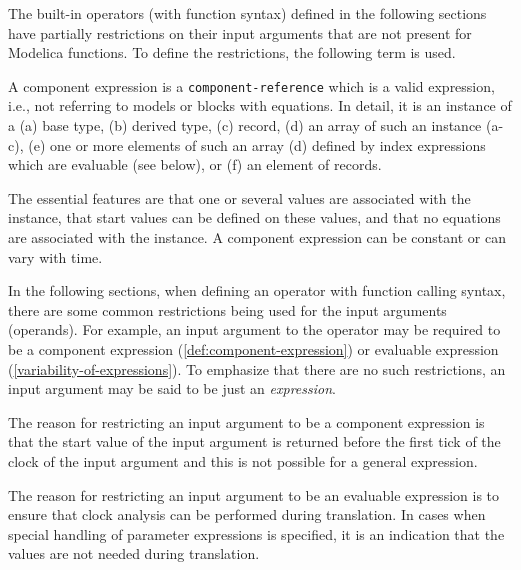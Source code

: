The built-in operators (with function syntax) defined in the following sections have partially restrictions on their input arguments that are not present for Modelica functions.
To define the restrictions, the following term is used.

\begin{definition}\label{def:component-expression}
A component expression is a \lstinline[language=grammar]!component-reference! which is a valid expression, i.e., not referring to models or blocks with equations.
In detail, it is an instance of a (a) base type, (b) derived type, (c) record, (d) an array of such an instance (a-c), (e) one or more elements of such an array (d) defined by index expressions which are evaluable (see below), or (f) an element of records.
\begin{nonnormative}
The essential features are that one or several values are associated with the instance, that start values can be defined on these values, and that no equations are associated with the instance.
A component expression can be constant or can vary with time.
\end{nonnormative}
\end{definition}

In the following sections, when defining an operator with function calling syntax, there are some common restrictions being used for the input arguments (operands).
For example, an input argument to the operator may be required to be a component expression (\cref{def:component-expression}) or evaluable expression (\cref{variability-of-expressions}).
To emphasize that there are no such restrictions, an input argument may be said to be just an \emph{expression}.

\begin{nonnormative}
The reason for restricting an input argument to be a component expression is that the start value of the input argument is returned before the first tick of the clock of the input argument and this
is not possible for a general expression.

The reason for restricting an input argument to be an evaluable expression is to ensure that clock analysis can be performed during translation.
In cases when special handling of parameter expressions is specified, it is an indication that the values are not needed during translation.
\end{nonnormative}

